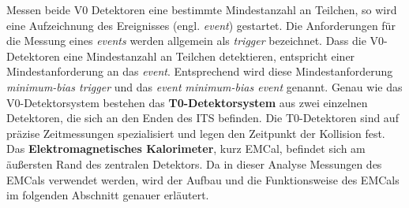 Messen beide V0 Detektoren eine bestimmte Mindestanzahl an Teilchen, so wird eine Aufzeichnung des Ereignisses (engl. \textit{event}) gestartet.
Die Anforderungen für die Messung eines \textit{events} werden allgemein als \textit{trigger} bezeichnet.
Dass die V0-Detektoren eine Mindestanzahl an Teilchen detektieren, entspricht einer Mindestanforderung an das \textit{event}.
Entsprechend wird diese Mindestanforderung \textit{minimum-bias trigger} und das \textit{event} \textit{minimum-bias event} genannt.
\newline
Genau wie das V0-Detektorsystem bestehen das \textbf{T0-Detektorsystem} aus zwei einzelnen Detektoren, die sich an den Enden des ITS befinden.
Die T0-Detektoren sind auf präzise Zeitmessungen spezialisiert und legen den Zeitpunkt der Kollision fest.
\newline
Das \textbf{Elektromagnetisches Kalorimeter}, kurz EMCal, befindet sich am äußersten Rand des zentralen Detektors.
Da in dieser Analyse Messungen des EMCals verwendet werden, wird der Aufbau und die Funktionsweise des EMCals im folgenden Abschnitt genauer erläutert.